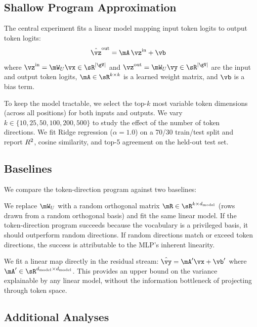 \subsection{Shallow Program Approximation}
\label{sec:shallow}

The central experiment fits a linear model mapping input token logits to output token logits:
\begin{equation}
    \hat{\vz}^{\text{out}} = \mA \, \vz^{\text{in}} + \vb
    \label{eq:shallow}
\end{equation}
where $\vz^{\text{in}} = \Wu \vx \in \sR^{|\gV|}$ and $\vz^{\text{out}} = \Wu \vy \in \sR^{|\gV|}$ are the input and output token logits, $\mA \in \sR^{k \times k}$ is a learned weight matrix, and $\vb$ is a bias term.

To keep the model tractable, we select the top-$k$ most variable token dimensions (across all positions) for both inputs and outputs.
We vary $k \in \{10, 25, 50, 100, 200, 500\}$ to study the effect of the number of token directions.
We fit Ridge regression ($\alpha = 1.0$) on a 70/30 train/test split and report $R^2$, cosine similarity, and top-5 agreement on the held-out test set.

\subsection{Baselines}
\label{sec:baselines}

We compare the token-direction program against two baselines:

We replace $\Wu$ with a random orthogonal matrix $\mR \in \sR^{k \times \dmodel}$ (rows drawn from a random orthogonal basis) and fit the same linear model.
If the token-direction program succeeds because the vocabulary is a privileged basis, it should outperform random directions.
If random directions match or exceed token directions, the success is attributable to the MLP's inherent linearity.

We fit a linear map directly in the residual stream: $\hat{\vy} = \mA' \vx + \vb'$ where $\mA' \in \sR^{\dmodel \times \dmodel}$.
This provides an upper bound on the variance explainable by any linear model, without the information bottleneck of projecting through token space.

\subsection{Additional Analyses}
\label{sec:additional}

